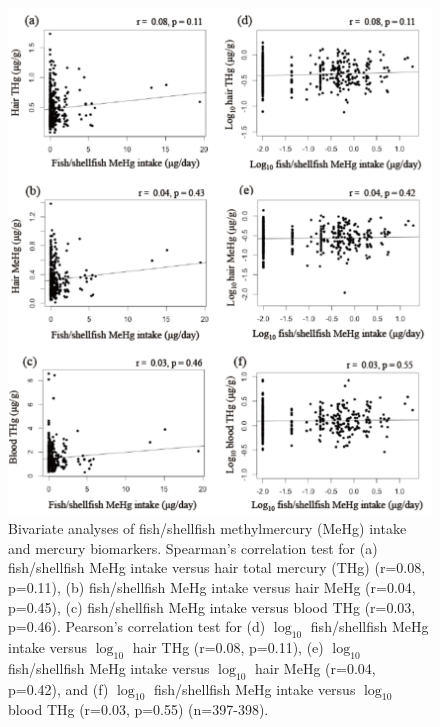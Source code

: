 \begin{figure}
  \centering
    \label{fig:Fig213}
  \includegraphics[scale=1]{Figures/Fig213.pdf}
  \caption[Bivariate analyses of fish/shellfish methylmercury intake and mercury biomarkers]{Bivariate analyses of fish/shellfish methylmercury (MeHg) intake and mercury biomarkers. Spearman's correlation test for (a) fish/shellfish MeHg intake versus hair total mercury (THg) (r=0.08, p=0.11), (b) fish/shellfish MeHg intake versus hair MeHg (r=0.04, p=0.45), (c) fish/shellfish MeHg intake versus blood THg (r=0.03, p=0.46). Pearson's correlation test for (d) $\log_{10}$ fish/shellfish MeHg intake versus $\log_{10}$ hair THg (r=0.08, p=0.11), (e) $\log_{10}$ fish/shellfish MeHg intake versus $\log_{10}$ hair MeHg (r=0.04, p=0.42), and (f) $\log_{10}$ fish/shellfish MeHg intake versus $\log_{10}$ blood THg (r=0.03, p=0.55) (n=397-398).}
\end{figure}

